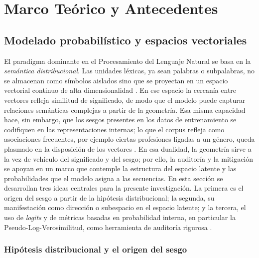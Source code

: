 \documentclass[12pt,a4paper]{report}
\begin{document}
\chapter{Marco Teórico y Antecedentes}
\label{chap:marco_teorico}

\section{Modelado probabilístico y espacios vectoriales}
\label{sec:modelado_probabilistico}

El paradigma dominante en el Procesamiento del Lenguaje Natural se basa en la \textit{semántica distribucional}. Las unidades léxicas, ya sean palabras o subpalabras, no se almacenan como símbolos aislados sino que se proyectan en un espacio vectorial continuo de alta dimensionalidad \cite{caliskan_semantics_2017}. En ese espacio la cercanía entre vectores refleja similitud de significado, de modo que el modelo puede capturar relaciones semánticas complejas a partir de la geometría. Esa misma capacidad hace, sin embargo, que los sesgos presentes en los datos de entrenamiento se codifiquen en las representaciones internas; lo que el corpus refleja como asociaciones frecuentes, por ejemplo ciertas profesiones ligadas a un género, queda plasmado en la disposición de los vectores \cite{caliskan_semantics_2017}. En esa dualidad, la geometría sirve a la vez de vehículo del significado y del sesgo; por ello, la auditoría y la mitigación se apoyan en un marco que contemple la estructura del espacio latente y las probabilidades que el modelo asigna a las secuencias. En esta sección se desarrollan tres ideas centrales para la presente investigación. La primera es el origen del sesgo a partir de la hipótesis distribucional; la segunda, su manifestación como dirección o subespacio en el espacio latente; y la tercera, el uso de \textit{logits} y de métricas basadas en probabilidad interna, en particular la Pseudo-Log-Verosimilitud, como herramienta de auditoría rigurosa \cite{salazar_masked_2020}.

\subsection{Hipótesis distribucional y el origen del sesgo}
\label{subsec:hipotesis_distribucional}
\end{document}
